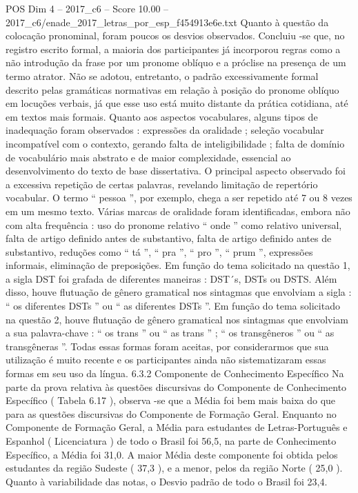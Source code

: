 \begin{textsample}{POS Dim 4 – 2017\_c6 – Score 10.00 – 2017\_c6/enade\_2017\_letras\_por\_esp\_f454913e6e.txt}
Quanto à questão da colocação pronominal, foram poucos os desvios observados.
Concluiu -se que, no registro escrito formal, a maioria dos participantes já incorporou regras como a não introdução da frase por um pronome oblíquo e a próclise na presença de um termo atrator.
Não se adotou, entretanto, o padrão excessivamente formal descrito pelas gramáticas normativas em relação à posição do pronome oblíquo em locuções verbais, já que esse uso está muito distante da prática cotidiana, até em textos mais formais.
Quanto aos aspectos vocabulares, alguns tipos de inadequação foram observados : expressões da oralidade ; seleção vocabular incompatível com o contexto, gerando falta de inteligibilidade ; falta de domínio de vocabulário mais abstrato e de maior complexidade, essencial ao desenvolvimento do texto de base dissertativa.
O principal aspecto observado foi a excessiva repetição de certas palavras, revelando limitação de repertório vocabular.
O termo “ pessoa ”, por exemplo, chega a ser repetido até 7 ou 8 vezes em um mesmo texto.
Várias marcas de oralidade foram identificadas, embora não com alta frequência : uso do pronome relativo “ onde ” como relativo universal, falta de artigo definido antes de substantivo, falta de artigo definido antes de substantivo, reduções como “ tá ”, “ pra ”, “ pro ”, “ prum ”, expressões informais, eliminação de preposições.
Em função do tema solicitado na questão 1, a sigla DST foi grafada de diferentes maneiras : DST´s, DSTs ou DSTS.
Além disso, houve flutuação de gênero gramatical nos sintagmas que envolviam a sigla : “ os diferentes DSTs ” ou “ as diferentes DSTs ”.
Em função do tema solicitado na questão 2, houve flutuação de gênero gramatical nos sintagmas que envolviam a sua palavra-chave : “ os trans ” ou “ as trans ” ; “ os transgêneros ” ou “ as transgêneras ”.
Todas essas formas foram aceitas, por considerarmos que sua utilização é muito recente e os participantes ainda não sistematizaram essas formas em seu uso da língua. 6.3.2 Componente de Conhecimento Específico Na parte da prova relativa às questões discursivas do Componente de Conhecimento Específico ( Tabela 6.17 ), observa -se que a Média foi bem mais baixa do que para as questões discursivas do Componente de Formação Geral.
Enquanto no Componente de Formação Geral, a Média para estudantes de Letras-Português e Espanhol ( Licenciatura ) de todo o Brasil foi 56,5, na parte de Conhecimento Específico, a Média foi 31,0.
A maior Média deste componente foi obtida pelos estudantes da região Sudeste ( 37,3 ), e a menor, pelos da região Norte ( 25,0 ).
Quanto à variabilidade das notas, o Desvio padrão de todo o Brasil foi 23,4.

\end{textsample}
